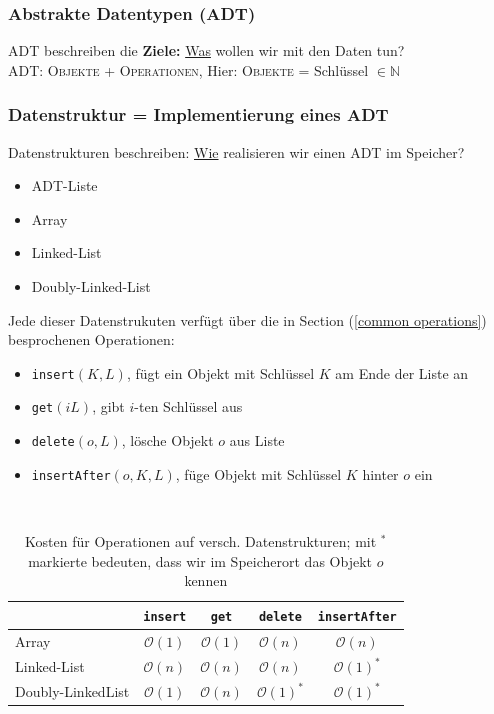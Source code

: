 \documentclass[a4paper]{article}
\begin{document}
\subsubsection*{Abstrakte Datentypen (ADT)}
ADT beschreiben die \textbf{Ziele:} \underline{Was} wollen wir mit den Daten tun? \\
ADT: \textsc{Objekte + Operationen}, Hier: \textsc{Objekte} = Schlüssel $\in \mathbb{N}$\\


\subsubsection*{Datenstruktur = Implementierung eines ADT}
Datenstrukturen beschreiben: \underline{Wie} realisieren wir einen ADT im Speicher?

\begin{itemize}
    \item ADT-Liste
    \item Array
    \item Linked-List
    \item Doubly-Linked-List
\end{itemize}
Jede dieser Datenstrukuten verfügt über die in Section (\ref{common operations}) besprochenen Operationen:
\begin{itemize}
    \item \texttt{insert}$(K, L)$, fügt ein Objekt mit Schlüssel $K$ am Ende der Liste an
    \item \texttt{get}$(i L)$,  gibt $i$-ten Schlüssel aus
    \item \texttt{delete}$(o, L)$, lösche Objekt $o$ aus Liste
    \item \texttt{insertAfter}$(o, K, L)$, füge Objekt mit Schlüssel $K$ hinter $o$ ein
\end{itemize}

    \begin{table}[H]
      \centering
      \footnotesize
      \caption{Kosten für Operationen auf versch. Datenstrukturen; mit $^*$ markierte bedeuten, dass wir im Speicherort das Objekt $o$ kennen}
      \label{tab:Costs on Datastructures}
      ~\\ 
      \hspace{-1.6cm}
      \begin{tabular}{|l | c | c | c | c |}
      \hline
        \textbf{} & 
        \textbf{\texttt{insert}} & 
        \textbf{\texttt{get}} &
        \textbf{\texttt{delete}} &
        \textbf{\texttt{insertAfter}} \\
        \hline
        Array & 
        $\mathcal{O}(1)$ & 
        $\mathcal{O}(1)$ &
        $\mathcal{O}(n)$ &
        $\mathcal{O}(n)$ \\
        Linked-List & 
        $\mathcal{O}(n)$ & 
        $\mathcal{O}(n)$ &
        $\mathcal{O}(n)$ &
        $\mathcal{O}(1)^*$ \\
        Doubly-LinkedList & 
        $\mathcal{O}(1)$ & 
        $\mathcal{O}(n)$ &
        $\mathcal{O}(1)^*$ &
        $\mathcal{O}(1)^*$ \\
        \hline
      \end{tabular}
    \end{table}
\end{document}
